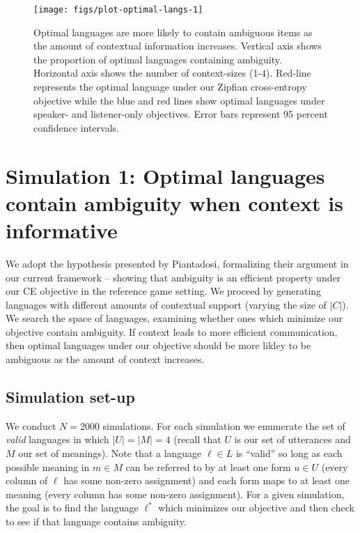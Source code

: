 \documentclass[10pt, letterpaper]{article}
\newenvironment{CodeChunk}{}{}
\begin{document}
\begin{CodeChunk}
\begin{figure*}[h]

{\centering \texttt{[image: figs/plot-optimal-langs-1]} 

}

\caption[Optimal languages are more likely to contain ambiguous items as the amount of contextual information increases]{Optimal languages are more likely to contain ambiguous items as the amount of contextual information increases. Vertical axis shows the proportion of optimal languages containing ambiguity. Horizontal axis shows the number of context-sizes (1-4). Red-line represents the optimal language under our Zipfian cross-entropy objective while the blue and red lines show optimal languages under speaker- and listener-only objectives. Error bars represent 95 percent confidence intervals.}\label{fig:plot-optimal-langs}
\end{figure*}
\end{CodeChunk}

\section{Simulation 1: Optimal languages contain ambiguity when context
is
informative}\label{simulation-1-optimal-languages-contain-ambiguity-when-context-is-informative}

We adopt the hypothesis presented by Piantadosi, formalizing their
argument in our current framework -- showing that ambiguity is an
efficient property under our CE objective in the reference game setting.
We proceed by generating languages with different amounts of contextual
support (varying the size of \(|C|\)). We search the space of languages,
examining whether ones which minimize our objective contain ambiguity.
If context leads to more efficient communication, then optimal languages
under our objective should be more likley to be ambiguous as the amount
of context increases.\par

\subsection{Simulation set-up}\label{simulation-set-up}

We conduct \(N=2000\) simulations. For each simulation we enumerate the
set of \emph{valid} languages in which \(|U|=|M|=4\) (recall that \(U\)
is our set of utterances and \(M\) our set of meanings). Note that a
language \(\ell \in L\) is ``valid'' so long as each possible meaning in
\(m \in M\) can be referred to by at least one form \(u \in U\) (every
column of \(\ell\) has some non-zero assignment) and each form maps to
at least one meaning (every column has some non-zero assignment). For a
given simulation, the goal is to find the language \(\ell^*\) which
minimizes our objective and then check to see if that language contains
ambiguity.\par
\end{document}
